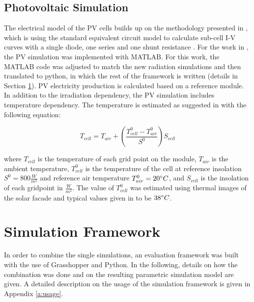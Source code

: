 		\subsection{Photovoltaic Simulation}
			The electrical model of the PV cells builds up on the methodology presented in \cite{hofer2016}, which is using the standard equivalent circuit model to calculate sub-cell I-V curves with a single diode, one series and one shunt resistance \cite{mermoud2010}. For the work in \cite{hofer2016}, the PV simulation was implemented with MATLAB. For this work, the MATLAB code was adjusted to match the new radiation simulations and then translated to python, in which the rest of the framework is written (details in Section \ref{s:simulationFramework}). PV electricity production is calculated based on a reference module. In addition to the irradiation dependency, the PV simulation includes temperature dependency. The temperature is estimated as suggested in \cite{Ross_Smokler_1986} with the following equation:

			\begin{equation}
				T_{cell} = T_{air} + \left(\frac{T_{cell}^0-T_{air}^0}{S^0}\right)S_{cell}
	      		\label{e:temp}
			\end{equation}

			where $T_{cell}$ is the temperature of each grid point on the module, $T_{air}$ is the ambient temperature, $T_{cell}^0$ is the temperature of the cell at reference insolation $S^0=800\frac{W}{m^2}$ and reference air temperature $T_{air}^0=20\degree C$, and $S_{cell}$ is the insolation of each gridpoint in $\frac{W}{m^2}$. The value of $T_{cell}^0$ was estimated using thermal images of the solar facade and typical values given in \cite{Ross_Smokler_1986} to be $38\degree C$. 



	\section{Simulation Framework}
	\label{s:simulationFramework}
		In order to combine the single simulations, an evaluation framework was built with the use of Grasshopper and Python. In the following, details on how the combination was done and on the resulting parametric simulation model are given. A detailed description on the usage of the simulation framework is given in Appendix \ref{a:usage}. 


